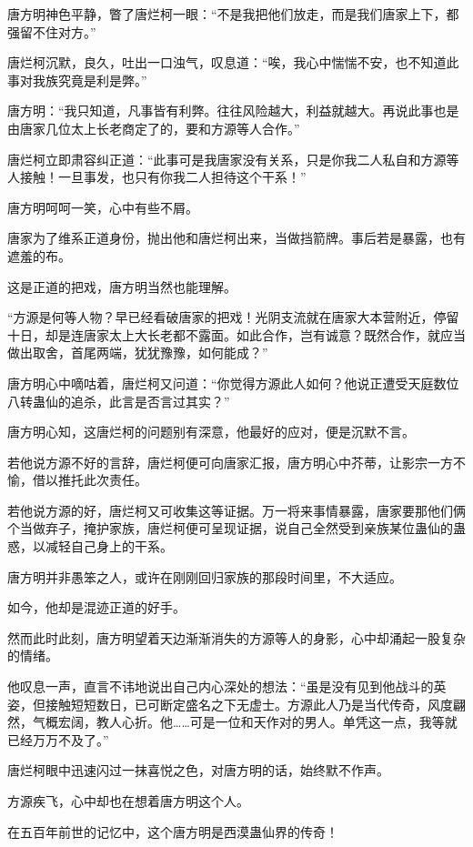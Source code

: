 \begin{this_body}
唐方明神色平静，瞥了唐烂柯一眼：“不是我把他们放走，而是我们唐家上下，都强留不住对方。”

唐烂柯沉默，良久，吐出一口浊气，叹息道：“唉，我心中惴惴不安，也不知道此事对我族究竟是利是弊。”

唐方明：“我只知道，凡事皆有利弊。往往风险越大，利益就越大。再说此事也是由唐家几位太上长老商定了的，要和方源等人合作。”

唐烂柯立即肃容纠正道：“此事可是我唐家没有关系，只是你我二人私自和方源等人接触！一旦事发，也只有你我二人担待这个干系！”

唐方明呵呵一笑，心中有些不屑。

唐家为了维系正道身份，抛出他和唐烂柯出来，当做挡箭牌。事后若是暴露，也有遮羞的布。

这是正道的把戏，唐方明当然也能理解。

“方源是何等人物？早已经看破唐家的把戏！光阴支流就在唐家大本营附近，停留十日，却是连唐家太上大长老都不露面。如此合作，岂有诚意？既然合作，就应当做出取舍，首尾两端，犹犹豫豫，如何能成？”

唐方明心中嘀咕着，唐烂柯又问道：“你觉得方源此人如何？他说正遭受天庭数位八转蛊仙的追杀，此言是否言过其实？”

唐方明心知，这唐烂柯的问题别有深意，他最好的应对，便是沉默不言。

若他说方源不好的言辞，唐烂柯便可向唐家汇报，唐方明心中芥蒂，让影宗一方不愉，借以推托此次责任。

若他说方源的好，唐烂柯又可收集这等证据。万一将来事情暴露，唐家要那他们俩个当做弃子，掩护家族，唐烂柯便可呈现证据，说自己全然受到亲族某位蛊仙的蛊惑，以减轻自己身上的干系。

唐方明并非愚笨之人，或许在刚刚回归家族的那段时间里，不大适应。

如今，他却是混迹正道的好手。

然而此时此刻，唐方明望着天边渐渐消失的方源等人的身影，心中却涌起一股复杂的情绪。

他叹息一声，直言不讳地说出自己内心深处的想法：“虽是没有见到他战斗的英姿，但接触短短数日，已可断定盛名之下无虚士。方源此人乃是当代传奇，风度翩然，气概宏阔，教人心折。他……可是一位和天作对的男人。单凭这一点，我等就已经万万不及了。”

唐烂柯眼中迅速闪过一抹喜悦之色，对唐方明的话，始终默不作声。

方源疾飞，心中却也在想着唐方明这个人。

在五百年前世的记忆中，这个唐方明是西漠蛊仙界的传奇！


\end{this_body}
